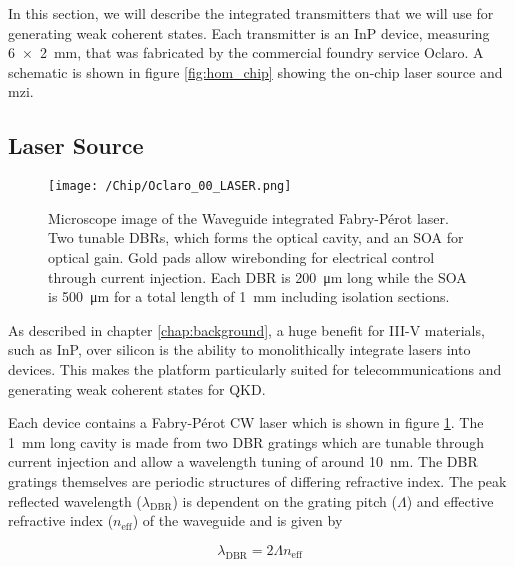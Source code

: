 In this section, we will describe the integrated transmitters that we will use for generating weak coherent states. Each transmitter is an \ac{InP} device, measuring \SI{6x2}{mm}, that was fabricated by the commercial foundry service Oclaro. A schematic is shown in figure \ref{fig:hom_chip} showing the on-chip laser source and \ac{mzi}.

\subsection{Laser Source}

\begin{figure}[t]
	\centering
	\texttt{[image: /Chip/Oclaro\_00\_LASER.png]}
	\caption[Microscope image of the waveguide integrated Fabry-P\'{e}rot laser]{Microscope image of the Waveguide integrated Fabry-P\'{e}rot laser. Two tunable \acsp{DBR}, which forms the optical cavity, and an \acs{SOA} for optical gain. Gold pads allow wirebonding for electrical control through current injection. Each \acs{DBR} is \SI{200}{\um} long while the \acs{SOA} is \SI{500}{\um} for a total length of \SI{1}{\mm} including isolation sections.}
	\label{fig:InP_laser}
\end{figure}

As described in chapter \ref{chap:background}, a huge benefit for {III-V} materials, such as \ac{InP}, over silicon is the ability to monolithically integrate lasers into devices. This makes the platform particularly suited for telecommunications and generating weak coherent states for \ac{QKD}. 


Each device contains a Fabry-P\'{e}rot \ac{CW} laser which is shown in figure \ref{fig:InP_laser}. The \SI{1}{mm} long cavity is made from two \ac{DBR} gratings which are tunable through current injection and allow a wavelength tuning of around \SI{10}{nm}. The \ac{DBR} gratings themselves are periodic structures of differing refractive index. The peak reflected wavelength ($\lambda_\text{DBR}$) is dependent on the grating pitch ($\Lambda$) and effective refractive index ($n_\text{eff}$) of the waveguide and is given by

\begin{equation}
	\lambda_\text{DBR} = 2\Lambda n_\text{eff}
\end{equation}

